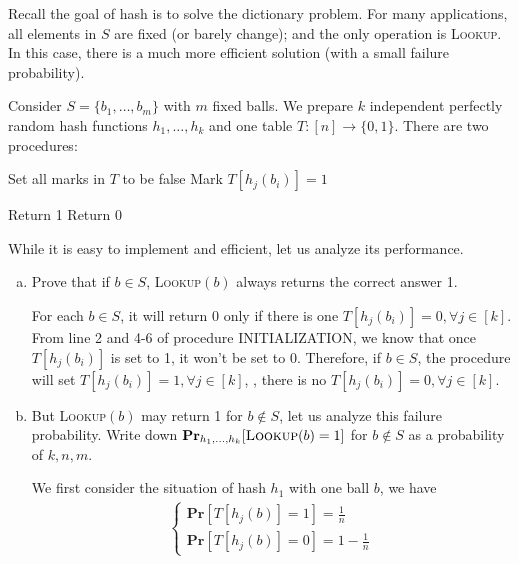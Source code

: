 \begin{problem}
    Recall the goal of hash is to solve the dictionary problem. For many applications, all elements in $S$ are fixed (or barely change); and the only operation is \textsc{Lookup}. In this case, there is a much more efficient solution (with a small failure probability).

    Consider $S = \{b_1 , \dots , b_m \}$ with $m$ fixed balls. We prepare $k$ independent perfectly random hash functions $h_1 , \dots , h_k$ and one table $T : [n] \rightarrow \{0, 1\}$. There are two procedures:

\begin{algorithm}[ht]
\begin{algorithmic}[1]
        \State Set all marks in $T$ to be false
        \State Mark $T[h_j(b_i)]=1$
        \EndFor
        \EndFor
    \EndProcedure

    \State Return 1
    \EndIf
    \State Return 0
    \EndFunction
\end{algorithmic}
\end{algorithm}

While it is easy to implement and efficient, let us analyze its performance.
\begin{enumerate}[(a)]
    \item Prove that if $b\in S$, \textsc{Lookup}$(b)$ always returns the correct answer 1.
    
    \Answer
    For each $b\in S$, it will return 0 only if there is one $T[h_j(b_i)]=0 ,\forall j \in [k]$. From line 2 and 4-6 of procedure INITIALIZATION, we know that once $T[h_j(b_i)]$ is set to 1, it won't be set to 0. Therefore, if $b\in S$, the procedure will set $T[h_j(b_i)]=1 ,\forall j \in [k]$, \ie, there is no $T[h_j(b_i)]=0 ,\forall j \in [k]$.

    \item But \textsc{Lookup}$(b)$ may return 1 for $b \notin S$, let us analyze this failure probability. Write down $\mathbf{Pr}_{h_1 ,\dots,h_k}[\textsc{Lookup}(b) = 1]$ for $b \notin S$ as a probability of $k, n, m$.
    
    \Answer

    We first consider the situation of hash $h_1$ with one ball $b$, we have 
    \begin{align}
        \begin{cases}
            \mathbf{Pr}[T[h_j(b)]=1]=\frac{1}{n} \\
            \mathbf{Pr}[T[h_j(b)]=0]=1- \frac{1}{n}
        \end{cases}
    \end{align}
     

\end{enumerate}
\end{problem}
